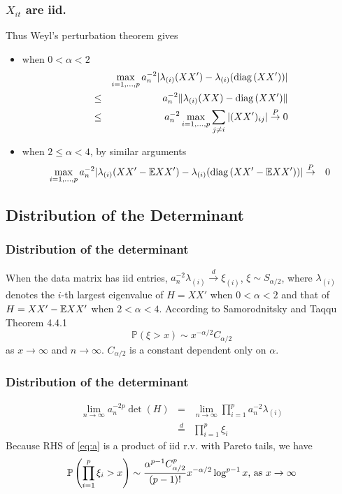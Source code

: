 \documentclass{beamer}
\renewcommand{\P}{
\mathbb P
}
\begin{document}
\begin{frame}
  \frametitle{$X_{it}$ are iid.}
  Thus Weyl's perturbation theorem gives
  \begin{itemize}
  \item when $0 < \alpha < 2$
    \begin{eqnarray*}
    && \max_{i=1,\dots,p} a_n^{-2} |\lambda_{(i)}(XX') - \lambda_{(i)}(\text{diag\,}(XX'))| \\
    &\leq& a_n^{-2} \|\lambda_{(i)}(XX) - \text{diag\,}(XX')\| \\
    &\leq& a_n^{-2} \max_{i=1,\dots,p} \sum_{j\neq i} |(XX')_{ij}|
    \overset{P}{\to} 0
    \end{eqnarray*}
  \item when $2 \leq \alpha < 4$, by similar arguments
    \begin{eqnarray*}
      \max_{i=1,\dots,p} a_n^{-2} |\lambda_{(i)}(XX' - \mathbb{E} XX') -
      \lambda_{(i)}(\text{diag\,}(XX' - \mathbb{E} XX'))|
      &\overset{P}{\to}& 0
    \end{eqnarray*}
  \end{itemize}
\end{frame}

\subsection{Distribution of the Determinant}
\begin{frame}
\frametitle{Distribution of the determinant}
When the data matrix has iid entries, $a_n^{-2} \lambda_{(i)} \overset{d}{\to}
\xi_{(i)}$, $\xi \sim S_{\alpha/2}$, where $\lambda_{(i)}$ denotes
the $i$-th largest eigenvalue of $H = XX'$ when $0 < \alpha < 2$ and that
of $H = XX' - \mathbb{E} XX'$ when $2 < \alpha < 4$. According to Samorodnitsky and
Taqqu\cite{SamorodnitskyTaqqu1994} Theorem 4.4.1
$$
\P(\xi > x) \sim x^{-\alpha/2} C_{\alpha/2}
$$
as $x \to \infty$ and $n \to \infty$. $C_{\alpha/2}$ is a constant
dependent only on $\alpha$.
\end{frame}

\begin{frame}
  \frametitle{Distribution of the determinant}
  \begin{eqnarray*}
    \lim_{n \to \infty} a_n^{-2p} \det(H) &=& \lim_{n \to \infty}
    \prod_{i=1}^p a_n^{-2} \lambda_{(i)} \nonumber \\
    &\overset{d}{=}& \prod_{i=1}^p \xi_{i} \label{eq:a}
  \end{eqnarray*}
  Because RHS of \eqref{eq:a} is a product of iid r.v. with Pareto
  tails, we have
  \[
  \P\left(
    \prod_{i=1}^p \xi_{i} > x
  \right) \sim {\alpha^{p-1} C_{\alpha/2}^p \over (p-1)!}  x^{-\alpha/2} \log^{p-1} x 
  \text{, as } x \to \infty
  \]
\end{frame}
\end{document}
